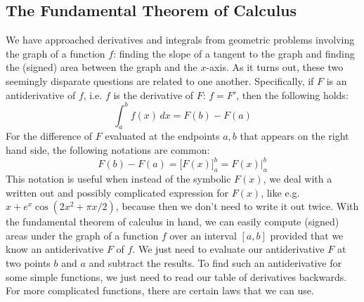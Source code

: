 
%

\subsection{The Fundamental Theorem of Calculus}
We have approached derivatives and integrals from geometric problems involving the graph of a function $f$: finding the slope of a tangent to the graph and finding the (signed) area between the graph and the $x$-axis. As it turns out, these two seemingly disparate questions are related to one another. Specifically, if $F$ is an antiderivative of $f$, i.e. $f$ is the derivative of $F$: $f = F'$, then the following holds:
\begin{equation}
 \int_a^b f(x) \, dx = F(b) - F(a)
\end{equation}
For the difference of $F$ evaluated at the endpoints $a,b$ that appears on the right hand side, the following notations are common:
\begin{equation}
 F(b) - F(a) = \Big[ F(x) \Big]_a^b = F(x) \bigg\rvert_a^b
\end{equation}
This notation is useful when instead of the symbolic $F(x)$, we deal with a written out and possibly complicated expression for $F(x)$, like e.g. $x + e^x \cos(2 x^2 + \pi x /2 )$, because then we don't need to write it out twice. With the fundamental theorem of calculus in hand, we can easily compute (signed) areas under the graph of a function $f$ over an interval $[a,b]$ provided that we know an antiderivative $F$ of $f$. We just need to evaluate our antiderivative $F$ at two points $b$ and $a$ and subtract the results. To find such an antiderivative for some simple functions, we just need to read our table of derivatives backwards. For more complicated functions, there are certain laws that we can use. %


